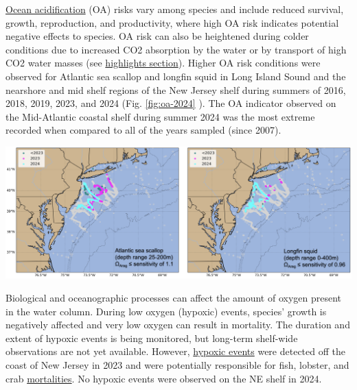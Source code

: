 \documentclass[
  10pt,
]{article}
\let\origfigure\figure
\let\endorigfigure\endfigure
\renewenvironment{figure}[1][2] {
    \expandafter\origfigure\expandafter[H]
} {
    \endorigfigure
}
\begin{document}
\href{https://noaa-edab.github.io/catalog/ocean_acidification.html}{Ocean acidification} (OA) risks vary among species and include reduced survival, growth, reproduction, and productivity, where high OA risk indicates potential negative effects to species. OA risk can also be heightened during colder conditions due to increased CO2 absorption by the water or by transport of high CO2 water masses (see \protect\hyperlink{highlights}{highlights section}). Higher OA risk conditions were observed for Atlantic sea scallop and longfin squid in Long Island Sound and the nearshore and mid shelf regions of the New Jersey shelf during summers of 2016, 2018, 2019, 2023, and 2024 (Fig. \ref{fig:oa-2024} ). The OA indicator observed on the Mid-Atlantic coastal shelf during summer 2024 was the most extreme recorded when compared to all of the years sampled (since 2007).

\begin{figure}

{\centering \includegraphics[width=1\linewidth]{SOE-NEFMC_files/figure-latex/oa-2024-1} 

}

\caption{Locations where bottom aragonite saturation state ($\Omega_{Arag}$; summer only: June-August) were at or below the laboratory-derived sensitivity level for Atlantic sea scallop (left panel) and longfin squid (right panel) for the time periods 2007-2022 (dark cyan) and 2023 only (magenta). Gray circles indicate locations where bottom $\Omega_{Arag}$ values were above the species specific sensitivity values.}\label{fig:oa-2024}
\end{figure}

Biological and oceanographic processes can affect the amount of oxygen present in the water column. During low oxygen (hypoxic) events, species' growth is negatively affected and very low oxygen can result in mortality. The duration and extent of hypoxic events is being monitored, but long-term shelf-wide observations are not yet available. However, \href{https://noaa-edab.github.io/catalog/observation_synthesis.html}{hypoxic events} were detected off the coast of New Jersey in 2023 and were potentially responsible for fish, lobster, and crab \href{https://sebsnjaesnews.rutgers.edu/2023/12/rutgers-scientists-observe-unusual-ocean-conditions-possibly-linked-to-mortality-in-marine-life-off-new-jersey/}{mortalities}. No hypoxic events were observed on the NE shelf in 2024.
\end{document}
